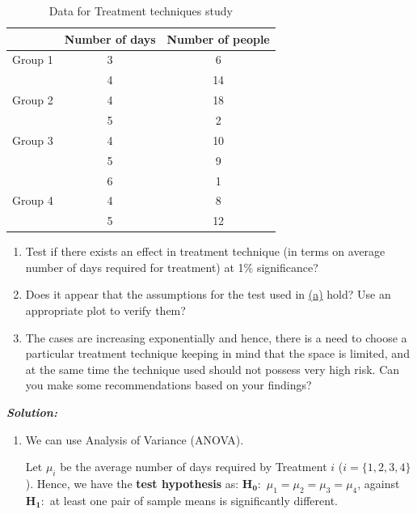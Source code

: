 \documentclass[12pt, oneside]{article}
\begin{document}
\begin{enumerate}
\begin{table}[h]
    \centering
    \begin{tabular}{lcc}
        \hline 
         ~ & \textbf{Number of days} & \textbf{Number of people} \\
        \hline
         Group 1 & 3 &  6 \\
                ~& 4 & 14 \\
        \hline
        Group 2 & 4 & 18 \\
                & 5 & 2 \\
        \hline
        Group 3 & 4 & 10 \\
                & 5 & 9 \\
                & 6 & 1 \\
        \hline
        Group 4 & 4 & 8 \\
                & 5 & 12 \\
        \hline
    \end{tabular}
    \caption{Data for Treatment techniques study}
    \label{tab:q3_main_data_1}
\end{table}

\begin{enumerate}
    \item \label{q3_a} Test if there exists an effect in treatment technique (in terms on average number of days required for treatment) at 1\% significance?
    \item Does it appear that the assumptions for the test used in \hyperref[q3_a]{(a)} hold? Use an appropriate plot to verify them?
    \item The cases are increasing exponentially and hence, there is a need to choose a particular treatment technique keeping in mind that the space is limited, and at the same time the technique used should not possess very high risk. Can you make some recommendations based on your findings?
\end{enumerate}

\textit{\textbf{Solution:}} \\

\begin{enumerate}
\item
We can use Analysis of Variance (ANOVA).

Let $\mu_i$ be the average number of days required by Treatment $i$ ($i = \{1,2,3,4\}$). Hence, we have the {\bf test hypothesis} as:  $\mathbf{H_0 :}$ $\mu_1 = \mu_2 = \mu_3 = \mu_4 $, against 
$\mathbf{H_1 :}$ at least one pair of sample means is significantly different.


\end{enumerate}
\end{enumerate}
\end{document}
